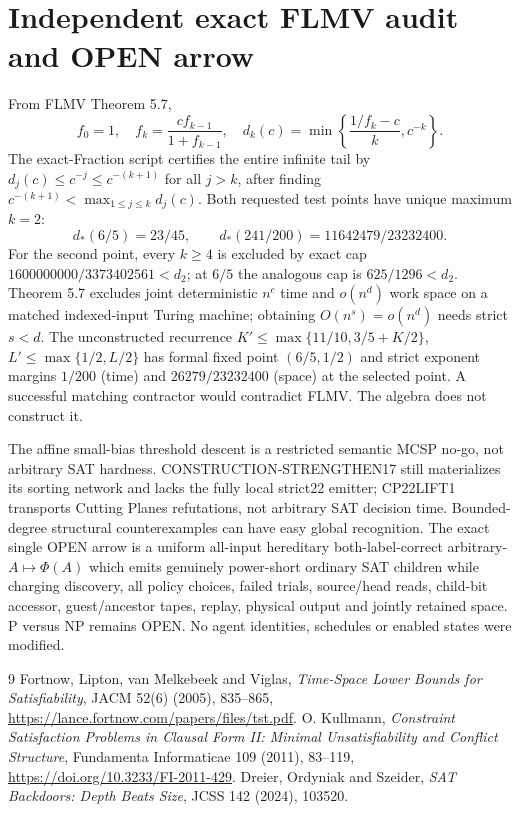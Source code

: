 \documentclass[11pt]{article}
\begin{document}
\section*{Independent exact FLMV audit and OPEN arrow}
From FLMV Theorem 5.7,
\[
f_0=1,\quad f_k=\frac{cf_{k-1}}{1+f_{k-1}},\quad
d_k(c)=\min\left\{\frac{1/f_k-c}{k},c^{-k}\right\}.
\]
The exact-Fraction script certifies the entire infinite tail by $d_j(c)\le c^{-j}\le c^{-(k+1)}$ for all $j>k$, after finding $c^{-(k+1)}<\max_{1\le j\le k}d_j(c)$. Both requested test points have unique maximum $k=2$:
\[
d_*(6/5)=23/45,\qquad
d_*(241/200)=11642479/23232400.
\]
For the second point, every $k\ge4$ is excluded by exact cap $1600000000/3373402561<d_2$; at $6/5$ the analogous cap is $625/1296<d_2$. Theorem 5.7 excludes joint deterministic $n^c$ time and $o(n^d)$ work space on a matched indexed-input Turing machine; obtaining $O(n^s)=o(n^d)$ needs strict $s<d$. The unconstructed recurrence $K'\le\max\{11/10,3/5+K/2\}$, $L'\le\max\{1/2,L/2\}$ has formal fixed point $(6/5,1/2)$ and strict exponent margins $1/200$ (time) and $26279/23232400$ (space) at the selected point. A successful matching contractor would contradict FLMV. The algebra does not construct it.

The affine small-bias threshold descent is a restricted semantic MCSP no-go, not arbitrary SAT hardness. CONSTRUCTION-STRENGTHEN17 still materializes its sorting network and lacks the fully local strict22 emitter; CP22LIFT1 transports Cutting Planes refutations, not arbitrary SAT decision time. Bounded-degree structural counterexamples can have easy global recognition. The exact single OPEN arrow is a uniform all-input hereditary both-label-correct arbitrary-$A\mapsto\Phi(A)$ which emits genuinely power-short ordinary SAT children while charging discovery, all policy choices, failed trials, source/head reads, child-bit accessor, guest/ancestor tapes, replay, physical output and jointly retained space. P versus NP remains OPEN. No agent identities, schedules or enabled states were modified.

\begin{thebibliography}{9}
 Fortnow, Lipton, van Melkebeek and Viglas, \emph{Time-Space Lower Bounds for Satisfiability}, JACM 52(6) (2005), 835--865, \url{https://lance.fortnow.com/papers/files/tst.pdf}.
 O. Kullmann, \emph{Constraint Satisfaction Problems in Clausal Form II: Minimal Unsatisfiability and Conflict Structure}, Fundamenta Informaticae 109 (2011), 83--119, \url{https://doi.org/10.3233/FI-2011-429}.
 Dreier, Ordyniak and Szeider, \emph{SAT Backdoors: Depth Beats Size}, JCSS 142 (2024), 103520.
\end{thebibliography}
\end{document}
